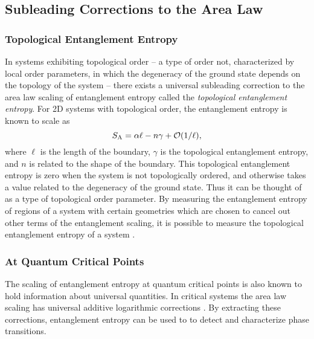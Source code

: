 \subsection{Subleading Corrections to the Area Law}
\subsubsection{Topological Entanglement Entropy}

In systems exhibiting topological order -- a type of order not, characterized by local order parameters, in which the degeneracy of the ground state depends on the topology of the system -- there exists a universal subleading correction to the area law scaling of entanglement entropy called the {\it topological entanglement entropy}.
For 2D systems with topological order, the entanglement entropy is known to scale as  \cite{Bbob, KP}
\begin{equation} \label{AL}
S_{\rm A} = \alpha \ell - n \gamma + \mathcal{O}(1/\ell),
\end{equation}
where $\ell$ is the length of the boundary, $\gamma$ is the topological entanglement entropy, and $n$ is related to the shape of the boundary.
This topological entanglement entropy is zero when the system is not topologically ordered, and  otherwise takes a value related to the degeneracy of the ground state.
Thus it can be thought of as a type of topological order parameter.
By measuring the entanglement entropy of regions of a system with certain geometries which are chosen to cancel out other terms of the entanglement scaling, it is possible to measure the topological entanglement entropy of a system \cite{LW}.

\subsubsection{At Quantum Critical Points}

The scaling of entanglement entropy at quantum critical points is also known to hold information about universal quantities.
In critical systems the area law scaling has universal additive logarithmic corrections \cite{Casini2007,Ryu, max}.
By extracting these corrections, entanglement entropy can be used to to detect and characterize phase transitions.


